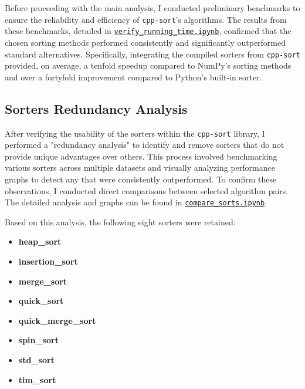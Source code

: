 \documentclass[twocolumn]{article}
\begin{document}
Before proceeding with the main analysis, I conducted preliminary benchmarks to ensure the reliability and efficiency of \texttt{cpp-sort}'s algorithms. The results from these benchmarks, detailed in \href{https://github.com/kiselevart/sorting-selector/blob/main/Implementation/analysis/verify_running_time.ipynb}{\texttt{verify\_running\_time.ipynb}}, confirmed that the chosen sorting methods performed consistently and significantly outperformed standard alternatives. Specifically, integrating the compiled sorters from \texttt{cpp-sort} provided, on average, a tenfold speedup compared to NumPy's sorting methods and over a fortyfold improvement compared to Python's built-in sorter.

\subsection{Sorters Redundancy Analysis}

After verifying the usability of the sorters within the \texttt{cpp-sort} library, I performed a "redundancy analysis" to identify and remove sorters that do not provide unique advantages over others. This process involved benchmarking various sorters across multiple datasets and visually analyzing performance graphs to detect any that were consistently outperformed. To confirm these observations, I conducted direct comparisons between selected algorithm pairs. The detailed analysis and graphs can be found in \href{https://github.com/kiselevart/sorting-selector/blob/main/Implementation/analysis/compare_sorts.ipynb}{\texttt{compare\_sorts.ipynb}}.

Based on this analysis, the following eight sorters were retained:
\begin{multicols}{2}
\begin{itemize}[itemsep=0.05em, topsep=0pt]
    \item \textbf{heap\_sort}
    \item \textbf{insertion\_sort}
    \item \textbf{merge\_sort}
    \item \textbf{quick\_sort}
    \item \textbf{quick\_merge\_sort}
    \item \textbf{spin\_sort}
    \item \textbf{std\_sort}
    \item \textbf{tim\_sort}
\end{itemize}
\end{multicols}
\end{document}
